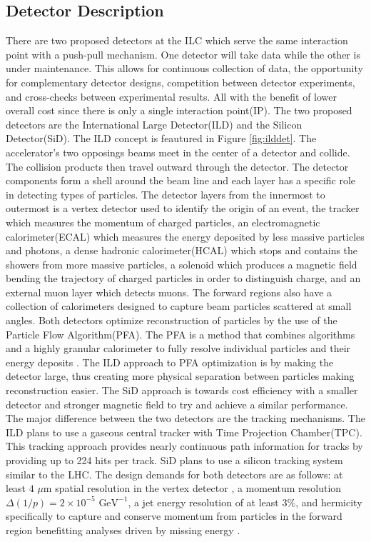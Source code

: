 \subsection{Detector Description}
\label{ild}

There are two proposed detectors at the ILC which serve the same interaction point with a push-pull mechanism. One detector will take data while the other is under maintenance. This allows for continuous collection of data, the opportunity for complementary detector designs, competition between detector experiments, and cross-checks between experimental results. All with the benefit of lower overall cost since there is only a single interaction point(IP). The two proposed detectors are the International Large Detector(ILD) and the Silicon Detector(SiD). The ILD concept is feautured in Figure \ref{fig:ilddet}. The accelerator's two opposings beams meet in the center of a detector and collide. The collision products then travel outward through the detector.  The detector components form a shell around the beam line and each layer has a specific role in detecting types of particles. The detector layers from the innermost to outermost  is a vertex detector used to identify the origin of an event, the tracker  which measures the momentum of charged particles, an electromagnetic calorimeter(ECAL) which measures the energy deposited by less massive particles and photons, a dense hadronic calorimeter(HCAL) which stops and contains the showers from more massive particles,  a solenoid which produces a magnetic field bending the trajectory of charged particles in order to distinguish charge, and an external muon layer which detects muons. The forward regions also have a collection of calorimeters designed to capture beam particles scattered at small angles. Both detectors optimize reconstruction of particles by the use of the Particle Flow Algorithm(PFA). The PFA is a method that combines algorithms and a highly granular calorimeter to fully resolve individual particles and their energy deposits \cite{pfa}.
The ILD approach to PFA optimization is by making the detector large, thus creating more physical separation between particles making reconstruction easier. The SiD approach is towards cost efficiency with a smaller detector and stronger magnetic field to try and achieve a similar performance. 
The major difference between the two detectors are the tracking mechanisms.  The ILD plans to use a gaseous central tracker with Time Projection Chamber(TPC). This tracking approach provides nearly continuous path information for tracks by providing up to 224 hits per track. SiD plans to use a silicon tracking system similar to the LHC. The design demands for both detectors are as follows: at least $4 \, \, \mu$m spatial resolution in the vertex detector , a momentum resolution $\Delta (1/p) =  2 \times  10^{-5} \, \, \text{GeV}^{-1}$, a jet energy resolution of at least $3\%$, and hermicity specifically to capture and conserve momentum from particles in the forward region benefitting analyses driven by missing energy \cite{currdetector}.


